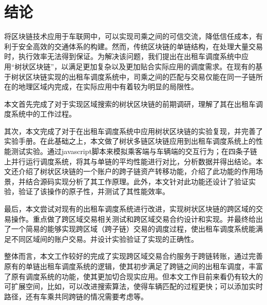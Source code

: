 

\chapter{结论}

将区块链技术应用于车联网中，可以实现司乘之间的可信交流，降低信任成本，有利于安全高效的交通体系的构建。然而，传统区块链的单链结构，在处理大量交易时，执行效率无法得到保证。为解决该问题，我们提出在出租车调度系统中应用“树状区块链”，以满足更加复杂以及更加贴合实际应用的调度需求。在现有的基于树状区块链实现的出租车调度系统中，司乘之间的匹配与交易仅能在同一子链所在的地理区域内完成，在实际应用中有着较为明显的局限性。
  
本文首先完成了对于实现区域搜索的树状区块链的前期调研，理解了其在出租车调度系统中的工作过程。

其次，本文完成了对于在出租车调度系统中应用树状区块链的实验复现，并完善了实验手册。在此基础之上，本文做了树状多链区块链应用到出租车调度系统上的性能测试实验。通过javascript脚本来模拟乘客端与车辆端的交互行为；在四条子链上并行运行调度系统，将其与单链的平均性能进行对比，分析数据并得出结论。本文还介绍了树状区块链的一个账户的跨子链资产转移功能，介绍了此功能的作用场景，并结合源码实现分析了其工作原理。此外，本文针对此功能还设计了验证实验，验证了该操作的原子性，并测试了其性能效率。

最后，本文尝试对现有的出租车调度系统进行改进，实现树状区块链的跨区域的交易操作。重点做了跨区域交易相关测试和跨区域交易合约设计和实现。并最终给出了一个简易的能够实现跨区域（跨子链）交易的调度过程，使出租车调度系统能满足不同区域间的账户交易。并设计实验验证了实现的正确性。

整体而言，本文工作较好的完成了实现跨区域交易合约服务于跨链转账，通过完善原有的单链出租车调度系统的逻辑，使其初步满足了跨链之间的出租车调度，丰富了原有调度系统的功能，使其更加切合现实应用。但本文工作目前来看仍有较大的可扩展空间，比如，可以改进搜索算法，使得车辆匹配的过程更快；可以添加实时路径，还有车乘共同跨链的情况需要考虑等。

